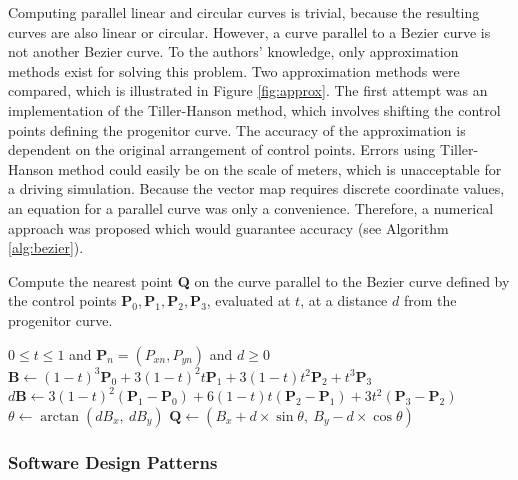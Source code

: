 \documentclass[12pt,twoside]{article}
\begin{document}
Computing parallel linear and circular curves is trivial, because the resulting curves are also linear or circular. However, a curve parallel to a Bezier curve is not another Bezier curve. To the authors' knowledge, only approximation methods exist for solving this problem. Two approximation methods were compared, which is illustrated in Figure \ref{fig:approx}. The first attempt was an implementation of the Tiller-Hanson method, which involves shifting the control points defining the progenitor curve. The accuracy of the approximation is dependent on the original arrangement of control points. Errors using Tiller-Hanson method could easily be on the scale of meters, which is unacceptable for a driving simulation. Because the vector map requires discrete coordinate values, an equation for a parallel curve was only a convenience. Therefore, a numerical approach was proposed which would guarantee accuracy (see Algorithm \ref{alg:bezier}).

\begin{algorithm}
\caption{Compute the nearest point \textbf{Q} on the curve parallel to the Bezier curve defined by the control points $\textbf{P}_0, \textbf{P}_1, \textbf{P}_2, \textbf{P}_3$, evaluated at $t$, at a distance $d$ from the progenitor curve.}
\begin{algorithmic}
\REQUIRE $0 \leq t \leq 1$ and $\textbf{P}_n = (P_{xn}, P_{yn})$ and $d \geq 0$
\STATE $\textbf{B} \leftarrow (1-t)^3\textbf{P}_0+3(1-t)^2t\textbf{P}_1+3(1-t)t^2\textbf{P}_2+t^3\textbf{P}_3$
\STATE $d\textbf{B} \leftarrow 3(1-t)^2(\textbf{P}_1-\textbf{P}_0)+6(1-t)t(\textbf{P}_2-\textbf{P}_1)+3t^2(\textbf{P}_3-\textbf{P}_2)$
\STATE $\theta \leftarrow \arctan(dB_x, ~ dB_y)$
\STATE $\textbf{Q} \leftarrow (B_x + d \times \sin\theta, ~ B_y - d \times \cos\theta)$
\end{algorithmic}
\label{alg:bezier}
\end{algorithm}

\subsubsection{Software Design Patterns}
\end{document}
